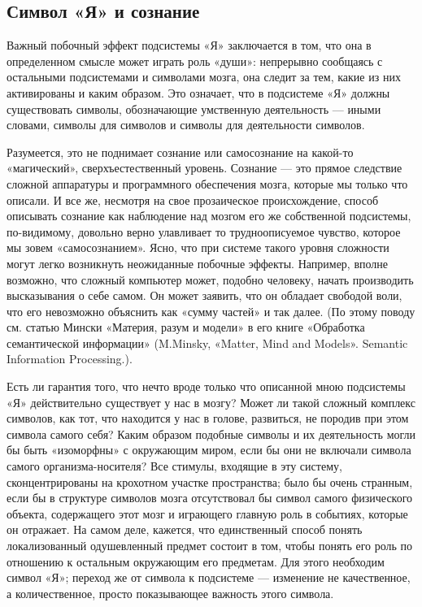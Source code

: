 \documentclass[../main.tex]{subfiles}
\begin{document}
\subsection{Символ «Я» и сознание}

Важный побочный эффект подсистемы «Я» заключается в том, что она в определенном смысле может играть роль «души»: непрерывно сообщаясь с остальными подсистемами и символами мозга, она следит за тем, какие из них активированы и каким образом. Это означает, что в подсистеме «Я» должны существовать символы, обозначающие умственную деятельность --- иными словами, символы для символов и символы для деятельности символов.

Разумеется, это не поднимает сознание или самосознание на какой-то «магический», сверхъестественный уровень. Сознание --- это прямое следствие сложной аппаратуры и программного обеспечения мозга, которые мы только что описали. И все же, несмотря на свое прозаическое происхождение, способ описывать сознание как наблюдение над мозгом его же собственной подсистемы, по-видимому, довольно верно улавливает то трудноописуемое чувство, которое мы зовем «самосознанием». Ясно, что при системе такого уровня сложности могут легко возникнуть неожиданные побочные эффекты. Например, вполне возможно, что сложный компьютер может, подобно человеку, начать производить высказывания о себе самом. Он может заявить, что он обладает свободой воли, что его невозможно объяснить как «сумму частей» и так далее. (По этому поводу см. статью Мински «Материя, разум и модели» в его книге «Обработка семантической информации» (M.Minsky, «Matter, Mind and Models». Semantic Information Processing.).

Есть ли гарантия того, что нечто вроде только что описанной мною подсистемы «Я» действительно существует у нас в мозгу? Может ли такой сложный комплекс символов, как тот, что находится у нас в голове, развиться, не породив при этом символа самого себя? Каким образом подобные символы и их деятельность могли бы быть «изоморфны» с окружающим миром, если бы они не включали символа самого организма-носителя? Все стимулы, входящие в эту систему, сконцентрированы на крохотном участке пространства; было бы очень странным, если бы в структуре символов мозга отсутствовал бы символ самого физического объекта, содержащего этот мозг и играющего главную роль в событиях, которые он отражает. На самом деле, кажется, что единственный способ понять локализованный одушевленный предмет состоит в том, чтобы понять его роль по отношению к остальным окружающим его предметам. Для этого необходим символ «Я»; переход же от символа к подсистеме --- изменение не качественное, а количественное, просто показывающее важность этого символа.
\end{document}
